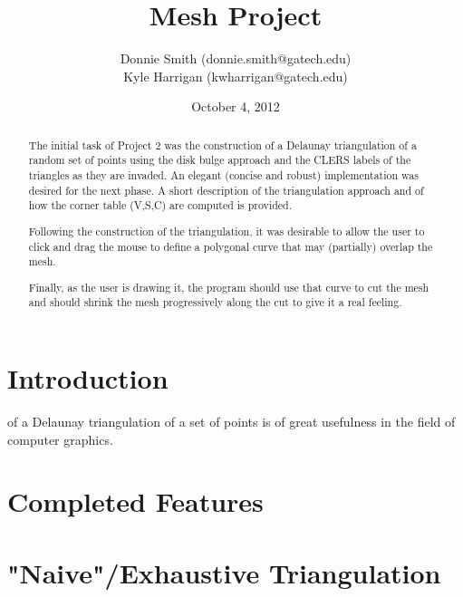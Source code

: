 \documentclass[letterpaper,10pt]{IEEEtran}
\title{Mesh Project}
\author{
Donnie Smith (donnie.smith@gatech.edu) \\
Kyle Harrigan (kwharrigan@gatech.edu) 
}
\date{October 4, 2012}                                           %
\begin{document}
\maketitle

%


 \begin{abstract}
 
The initial task of Project 2 was the construction of a Delaunay triangulation of a random set of points using the disk bulge approach and the CLERS labels of the triangles as they are invaded.  An elegant (concise and robust) implementation was desired for the next phase. A short description of the triangulation approach and of how the corner table (V,S,C) are computed is provided.

Following the construction of the triangulation, it was desirable to allow the user to click and drag the mouse to define a polygonal curve that may (partially) overlap the mesh.

Finally, as the user is drawing it, the program should use that curve to cut the mesh and should shrink the mesh progressively along the cut to give it a real feeling.
 
 \end{abstract}

\section{Introduction}
 of a Delaunay triangulation of a set of points is of great usefulness in the field of computer graphics. 
 \section{Completed Features}

 
\section{"Naive"/Exhaustive Triangulation}
\end{document}
